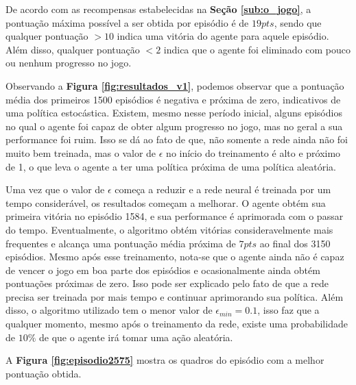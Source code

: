 De acordo com as recompensas estabelecidas na \textbf{Seção \ref{sub:o_jogo}}, a pontuação máxima possível a ser obtida por episódio é de $19pts$, sendo que qualquer pontuação $>10$ indica uma vitória do agente para aquele episódio. Além disso, qualquer pontuação $<2$ indica que o agente foi eliminado com pouco ou nenhum progresso no jogo.

Observando a \textbf{Figura \ref{fig:resultados_v1}}, podemos observar que a pontuação média dos primeiros 1500 episódios é negativa e próxima de zero, indicativos de uma política estocástica. Existem, mesmo nesse período inicial, alguns episódios no qual o agente foi capaz de obter algum progresso no jogo, mas no geral a sua performance foi ruim. Isso se dá ao fato de que, não somente a rede ainda não foi muito bem treinada, mas o valor de $\epsilon$ no início do treinamento é alto e próximo de 1, o que leva o agente a ter uma política próxima de uma política aleatória. 

Uma vez que o valor de $\epsilon$ começa a reduzir e a rede neural é treinada por um tempo considerável, os resultados começam a melhorar. O agente obtém sua primeira vitória no episódio 1584, e sua performance é aprimorada com o passar do tempo. Eventualmente, o algoritmo obtém vitórias consideravelmente mais frequentes e alcança uma pontuação média próxima de $7pts$ ao final dos 3150 episódios. Mesmo após esse treinamento, nota-se que o agente ainda não é capaz de vencer o jogo em boa parte dos episódios e ocasionalmente ainda obtém pontuações próximas de zero. Isso pode ser explicado pelo fato de que a rede precisa ser treinada por mais tempo e continuar aprimorando sua política. Além disso, o algoritmo utilizado tem o menor valor de $\epsilon_{min}=0.1$, isso faz que a qualquer momento, mesmo após o treinamento da rede, existe uma probabilidade de $10\%$ de que o agente irá tomar uma ação aleatória.

A \textbf{Figura \ref{fig:episodio2575}} mostra os quadros do episódio com a melhor pontuação obtida.

